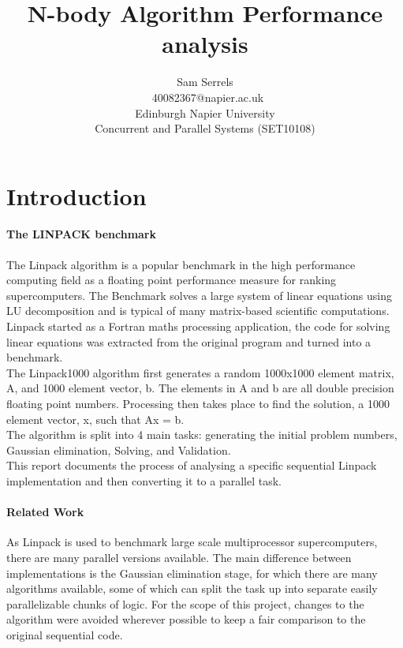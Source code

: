 \documentclass[conference]{acmsiggraph}
\title{N-body Algorithm Performance analysis}
\author{Sam Serrels\\\ 40082367@napier.ac.uk \\
Edinburgh Napier University\\
Concurrent and Parallel Systems (SET10108)}
\begin{document}
\maketitle

\section{Introduction}

\paragraph{The LINPACK benchmark}
The Linpack algorithm is a popular benchmark in the high performance computing field as a floating point performance measure for ranking supercomputers.
The Benchmark solves a large system of linear equations using LU decomposition and is typical of many matrix-based scientific computations.
Linpack started as a Fortran maths processing application, the code for solving linear equations was extracted from the original program and turned into a benchmark.  
\cite{Dongarra03thelinpack}
\\
The Linpack1000 algorithm first generates a random 1000x1000 element matrix, A, and 1000 element vector, b. The elements in A and b are all double precision floating point numbers. 
Processing then takes place to find the solution, a 1000 element vector, x, such that Ax = b.
\\
The algorithm is split into 4 main tasks: generating the initial problem numbers, Gaussian elimination, Solving, and Validation.
\\
This report documents the process of analysing a specific sequential Linpack implementation and then converting it to a parallel task.

\paragraph{Related Work}
As Linpack is used to benchmark large scale multiprocessor supercomputers, there are many parallel versions available. 
The main difference between implementations is the Gaussian elimination stage, for which there are many algorithms available, some of which can split the task up into separate easily parallelizable chunks of logic. For the scope of this project, changes to the algorithm were avoided wherever possible to keep a fair comparison to the original sequential code.
\end{document}
